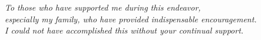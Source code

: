 
\begin{dedication}
\vspace*{\fill}
\begin{center}
\textit{To those who have supported me during this endeavor,\\
especially my family, who have provided indispensable encouragement.\\
I could not have accomplished this without your continual support.}
\end{center}
\vspace*{\fill}
\end{dedication}
